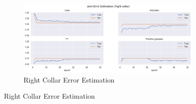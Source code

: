 \begin{figure}[!ht]
\begin{subfigure}[b]{0.47\linewidth}
        \label{fig:v2_leco_jt_ee}
    \end{subfigure}
    \hfill
    \begin{subfigure}[b]{0.47\linewidth}
        \centering
        \includegraphics[width=\textwidth]{figures/Results/v2/jt/Right collar_ErrorEstimation.png}
        \caption{Right Collar Error Estimation}
        \label{fig:v2_rico_jt_ee}
    \end{subfigure}
  \end{figure}
  

